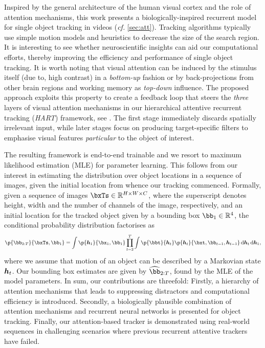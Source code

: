     Inspired by the general architecture of the human visual cortex and the role of attention mechanisms, this work presents a biologically-inspired recurrent model for single object tracking in videos (\emph{cf.} \cref{sec:att}). Tracking algorithms typically use simple motion models and heuristics to decrease the size of the search region. It is interesting to see whether neuroscientific insights can aid our computational efforts, thereby improving the efficiency and performance of single object tracking.
	It is worth noting that visual attention can be induced by the stimulus itself (due to, \eg high contrast) in a \emph{bottom-up} fashion or by back-projections from other brain regions and working memory as \emph{top-down} influence. The proposed approach exploits this property to create a feedback loop that steers the \emph{three} layers of visual attention mechanisms in our hierarchical attentive recurrent tracking (\emph{HART}) framework, see . The first stage immediately discards spatially irrelevant input, while later stages focus on producing target-specific filters to emphasise visual features \emph{particular} to the object of interest.
	
    The resulting framework is end-to-end trainable and we resort to maximum likelihood estimation (MLE) for parameter learning.
	This follows from our interest in estimating the distribution over object locations in a sequence of images, given the initial location from whence our tracking commenced. 
	Formally, given a sequence of images $\bxTs \in \RR^{H \times W \times C}$, where the superscript denotes height, width and the number of channels of the image, respectively, and an initial location for the tracked object given by a bounding box $\bb_1 \in \RR^4$, the conditional probability distribution factorises as
    \begin{equation}
        \p{\bb_{2:T}}{\bxTs, \bb_1} = \int \p{\B{h}_1}{\bx_1, \bb_1} \prod_{t=2}^T \int \p{\bbt}{\B{h}_t} \p{\B{h}_t}{\bxt, \bb_{t-1}, \B{h}_{t-1}} \dint \B{h}_t \dint \B{h}_1,
    \end{equation}
    where we assume that motion of an object can be described by a Markovian state $\B{h}_t$.
    Our bounding box estimates are given by $\widehat{\bb}_{2:T}$, found by the MLE of the model parameters. In sum, our contributions are threefold: 
    Firstly, a hierarchy of attention mechanisms that leads to suppressing distractors and computational efficiency is introduced.
    Secondly, a biologically plausible combination of attention mechanisms and recurrent neural networks is presented for object tracking.
    Finally, our attention-based tracker is demonstrated using real-world sequences in challenging scenarios where previous recurrent attentive trackers have failed.
    
